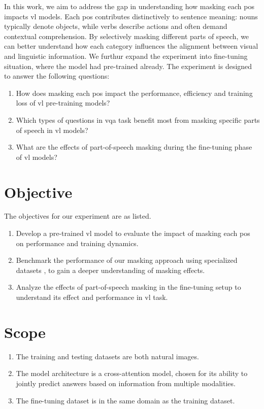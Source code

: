 In this work, we aim to address the gap in understanding how masking each \acrfull{pos} impacts \acrshort{vl} models.
Each \acrshort{pos} contributes distinctively to sentence meaning: nouns typically denote objects, while verbs describe actions and often demand contextual comprehension.
By selectively masking different parts of speech, we can better understand how each category influences the alignment between visual and linguistic information.
We furthur expand the experiment into fine-tuning situation, where the model had pre-trained already.
The experiment is designed to answer the following questions:
\begin{enumerate}
    \item How does masking each \acrshort{pos} impact the performance, efficiency and training loss of \acrshort{vl} pre-training models?
    \item Which types of questions in \acrfull{vqa} task benefit most from masking specific parts of speech in \acrshort{vl} models?
    \item What are the effects of part-of-speech masking during the fine-tuning phase of \acrshort{vl} models?
\end{enumerate}

\section{Objective}
The objectives for our experiment are as listed.
\begin{enumerate}
    \item Develop a pre-trained \acrshort{vl} model to evaluate the impact of masking each \acrshort{pos} on performance and training dynamics.
    \item Benchmark the performance of our masking approach using specialized datasets \cite{valse, foil-dataset}, to gain a deeper understanding of masking effects.
    \item Analyze the effects of part-of-speech masking in the fine-tuning setup to understand its effect and performance in \acrshort{vl} task.
\end{enumerate}

\section{Scope}
\begin{enumerate}
    \item The training and testing datasets are both natural images.
    \item The model architecture is a cross-attention model, chosen for its ability to jointly predict answers based on information from multiple modalities.
    \item The fine-tuning dataset is in the same domain as the training dataset.
\end{enumerate}


